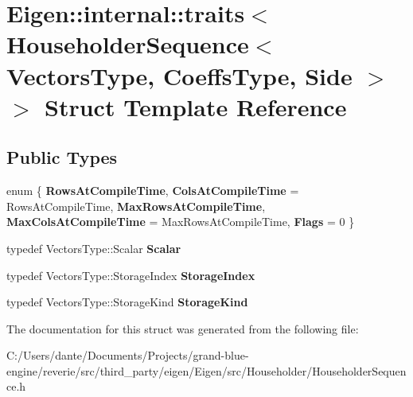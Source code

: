 \hypertarget{struct_eigen_1_1internal_1_1traits_3_01_householder_sequence_3_01_vectors_type_00_01_coeffs_type_00_01_side_01_4_01_4}{}\section{Eigen\+::internal\+::traits$<$ Householder\+Sequence$<$ Vectors\+Type, Coeffs\+Type, Side $>$ $>$ Struct Template Reference}
\label{struct_eigen_1_1internal_1_1traits_3_01_householder_sequence_3_01_vectors_type_00_01_coeffs_type_00_01_side_01_4_01_4}
\subsection*{Public Types}
\begin{DoxyCompactItemize}
\item 
\mbox{\label{struct_eigen_1_1internal_1_1traits_3_01_householder_sequence_3_01_vectors_type_00_01_coeffs_type_00_01_side_01_4_01_4_ac334cf57810e5f6ab1fdd9a7e48f99a6}} 
enum \{ \newline
{\bfseries Rows\+At\+Compile\+Time}, 
{\bfseries Cols\+At\+Compile\+Time} = Rows\+At\+Compile\+Time, 
{\bfseries Max\+Rows\+At\+Compile\+Time}, 
{\bfseries Max\+Cols\+At\+Compile\+Time} = Max\+Rows\+At\+Compile\+Time, 
\newline
{\bfseries Flags} = 0
 \}
\item 
\mbox{\label{struct_eigen_1_1internal_1_1traits_3_01_householder_sequence_3_01_vectors_type_00_01_coeffs_type_00_01_side_01_4_01_4_a9ede8dfbf4a63e58b5a9b1c18a545ace}} 
typedef Vectors\+Type\+::\+Scalar {\bfseries Scalar}
\item 
\mbox{\label{struct_eigen_1_1internal_1_1traits_3_01_householder_sequence_3_01_vectors_type_00_01_coeffs_type_00_01_side_01_4_01_4_a178edf36545f29db3ec5052a7a79d33d}} 
typedef Vectors\+Type\+::\+Storage\+Index {\bfseries Storage\+Index}
\item 
\mbox{\label{struct_eigen_1_1internal_1_1traits_3_01_householder_sequence_3_01_vectors_type_00_01_coeffs_type_00_01_side_01_4_01_4_a270a1e2a935fb1e006b2eca85157cf7b}} 
typedef Vectors\+Type\+::\+Storage\+Kind {\bfseries Storage\+Kind}
\end{DoxyCompactItemize}


The documentation for this struct was generated from the following file\+:\begin{DoxyCompactItemize}
\item 
C\+:/\+Users/dante/\+Documents/\+Projects/grand-\/blue-\/engine/reverie/src/third\+\_\+party/eigen/\+Eigen/src/\+Householder/Householder\+Sequence.\+h\end{DoxyCompactItemize}
